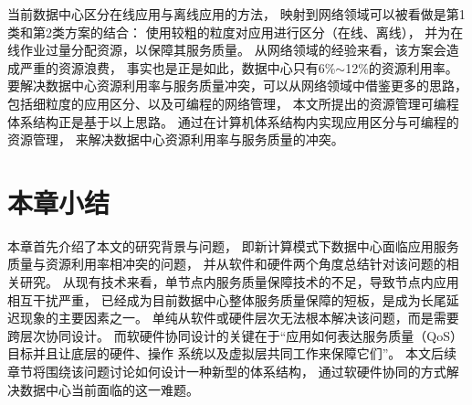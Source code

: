 当前数据中心区分在线应用与离线应用的方法，
映射到网络领域可以被看做是第1类和第2类方案的结合：
使用较粗的粒度对应用进行区分（在线、离线），
并为在线作业过量分配资源，以保障其服务质量。
从网络领域的经验来看，该方案会造成严重的资源浪费，
事实也是正是如此，数据中心只有6\%$\sim$12\%的资源利用率。
要解决数据中心资源利用率与服务质量冲突，可以从网络领域中借鉴更多的思路，
包括细粒度的应用区分、以及可编程的网络管理，
本文所提出的资源管理可编程体系结构正是基于以上思路。
通过在计算机体系结构内实现应用区分与可编程的资源管理，
来解决数据中心资源利用率与服务质量的冲突。



\section{本章小结}

本章首先介绍了本文的研究背景与问题，
即新计算模式下数据中心面临应用服务质量与资源利用率相冲突的问题，
并从软件和硬件两个角度总结针对该问题的相关研究。
从现有技术来看，单节点内服务质量保障技术的不足，导致节点内应用相互干扰严重，
已经成为目前数据中心整体服务质量保障的短板，是成为长尾延迟现象的主要因素之一。
单纯从软件或硬件层次无法根本解决该问题，而是需要跨层次协同设计。
而软硬件协同设计的关键在于``应用如何表达服务质量（QoS）目标并且让底层的硬件、操作
系统以及虚拟层共同工作来保障它们''\cite{21st_architecture}。
本文后续章节将围绕该问题讨论如何设计一种新型的体系结构，
通过软硬件协同的方式解决数据中心当前面临的这一难题。


